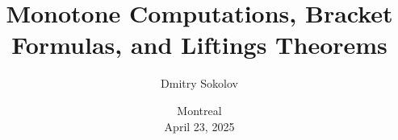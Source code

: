

\titlegraphic{
    
}


\title[]{
    Monotone Computations, Bracket Formulas, and Liftings Theorems
}

\author{
    Dmitry Sokolov
}  


\date{
    Montreal\\
    April 23, 2025
}






    \maketitle
    
    
    
    
    
    

